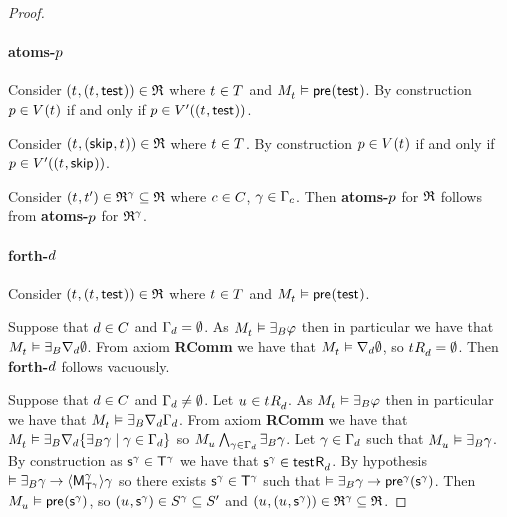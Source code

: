\begin{proof}
\paragraph{atoms-$\atomP$}
Consider $(\kStateT, (\kStateT, \aStateTest)) \in \refinement$ where $\kStateT \in \kStatesT$ and $\kPModel{\kStateT} \entails \aPrecondition(\aStateTest)$.
By construction $\atomP \in \kValuation(\kStateT)$ if and only if $\atomP \in \kValuationP((\kStateT, \aStateTest))$.

Consider $(\kStateT, (\aStateSkip, \kStateT)) \in \refinement$ where $\kStateT \in \kStatesT$.
By construction $\atomP \in \kValuation(\kStateT)$ if and only if $\atomP \in \kValuationP((\kStateT, \aStateSkip))$.

Consider $(\kStateT, \kStateTP) \in \refinement^\gamma \subseteq \refinement$ where $\agentC \in \agentsC$, $\gamma \in \Gamma_\agentC$.
Then {\bf atoms-$\atomP$} for $\refinement$ follows from {\bf atoms-$\atomP$} for $\refinement^\gamma$.

\paragraph{forth-$\agentD$}
Consider $(\kStateT, (\kStateT, \aStateTest)) \in \refinement$ where $\kStateT \in \kStatesT$ and $\kPModel{\kStateT} \entails \aPrecondition(\aStateTest)$.

Suppose that $\agentD \in \agentsC$ and $\Gamma_\agentD = \emptyset$.
As $\kPModel{\kStateT} \entails \someactsBs \phi$ then in particular we have that $\kPModel{\kStateT} \entails \someactsBs \coversD \emptyset$.
From \axiomAamlK{} axiom {\bf RComm} we have that $\kPModel{\kStateT} \entails \coversD \emptyset$, so $\kSuccessorsD{\kStateT} = \emptyset$.
Then {\bf forth-$\agentD$} follows vacuously.

Suppose that $\agentD \in \agentsC$ and $\Gamma_\agentD \neq \emptyset$.
Let $\kStateU \in \kSuccessorsD{\kStateT}$.
As $\kPModel{\kStateT} \entails \someactsBs \phi$ then in particular we have that $\kPModel{\kStateT} \entails \someactsBs \coversD \Gamma_\agentD$.
From \axiomAamlK{} axiom {\bf RComm} we have that $\kPModel{\kStateT} \entails \someactsBs \coversD \{\someactsBs \gamma \mid \gamma \in \Gamma_\agentD\}$ so $\kPModel{\kStateU} \bigwedge_{\gamma \in \Gamma_\agentD} \someactsBs \gamma$.
Let $\gamma \in \Gamma_\agentD$ such that $\kPModel{\kStateU} \entails \someactsBs \gamma$.
By construction as $\aStateS[\gamma] \in \aStatesT[\gamma]$ we have that $\aStateS[\gamma] \in \aSuccessorsD{\aStateTest}$.
By hypothesis $\entails \someactsBs \gamma \implies \actionE{\aPModel[\gamma]{\aStatesT[\gamma]}} \gamma$ so there exists $\aStateS[\gamma] \in \aStatesT[\gamma]$ such that $\entails \someactsBs \gamma \implies \aPrecondition[\gamma](\aStateS[\gamma])$.
Then $\kPModel{\kStateU} \entails \aPrecondition(\aStateS[\gamma])$, so $(\kStateU, \aStateS[\gamma]) \in \kStates[\gamma] \subseteq \kStatesP$ and $(\kStateU, (\kStateU, \aStateS[\gamma])) \in \refinement^\gamma \subseteq \refinement$.


\end{proof}
